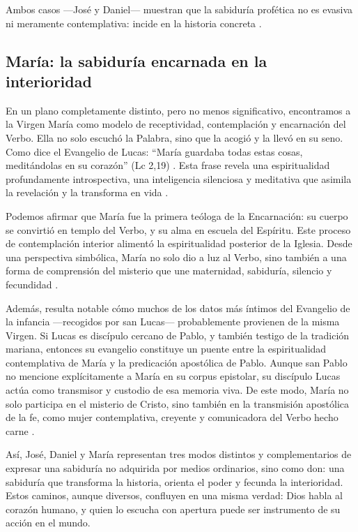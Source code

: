 Ambos casos —José y Daniel— muestran que la sabiduría profética no es evasiva ni meramente contemplativa: incide en la historia concreta \cite{jung1959,jung1971}.

\subsection*{María: la sabiduría encarnada en la interioridad}

En un plano completamente distinto, pero no menos significativo, encontramos a la Virgen María como modelo de receptividad, contemplación y encarnación del Verbo. Ella no solo escuchó la Palabra, sino que la acogió y la llevó en su seno. Como dice el Evangelio de Lucas: ``María guardaba todas estas cosas, meditándolas en su corazón'' (Lc 2,19) \cite{Biblia}. Esta frase revela una espiritualidad profundamente introspectiva, una inteligencia silenciosa y meditativa que asimila la revelación y la transforma en vida \cite{jung1959,jung1964}.

Podemos afirmar que María fue la primera teóloga de la Encarnación: su cuerpo se convirtió en templo del Verbo, y su alma en escuela del Espíritu. Este proceso de contemplación interior alimentó la espiritualidad posterior de la Iglesia. Desde una perspectiva simbólica, María no solo dio a luz al Verbo, sino también a una forma de comprensión del misterio que une maternidad, sabiduría, silencio y fecundidad \cite{jung1964}.

Además, resulta notable cómo muchos de los datos más íntimos del Evangelio de la infancia —recogidos por san Lucas— probablemente provienen de la misma Virgen. Si Lucas es discípulo cercano de Pablo, y también testigo de la tradición mariana, entonces su evangelio constituye un puente entre la espiritualidad contemplativa de María y la predicación apostólica de Pablo. Aunque san Pablo no mencione explícitamente a María en su corpus epistolar, su discípulo Lucas actúa como transmisor y custodio de esa memoria viva. De este modo, María no solo participa en el misterio de Cristo, sino también en la transmisión apostólica de la fe, como mujer contemplativa, creyente y comunicadora del Verbo hecho carne \cite{jung1959}.

Así, José, Daniel y María representan tres modos distintos y complementarios de expresar una sabiduría no adquirida por medios ordinarios, sino como don: una sabiduría que transforma la historia, orienta el poder y fecunda la interioridad. Estos caminos, aunque diversos, confluyen en una misma verdad: Dios habla al corazón humano, y quien lo escucha con apertura puede ser instrumento de su acción en el mundo.


